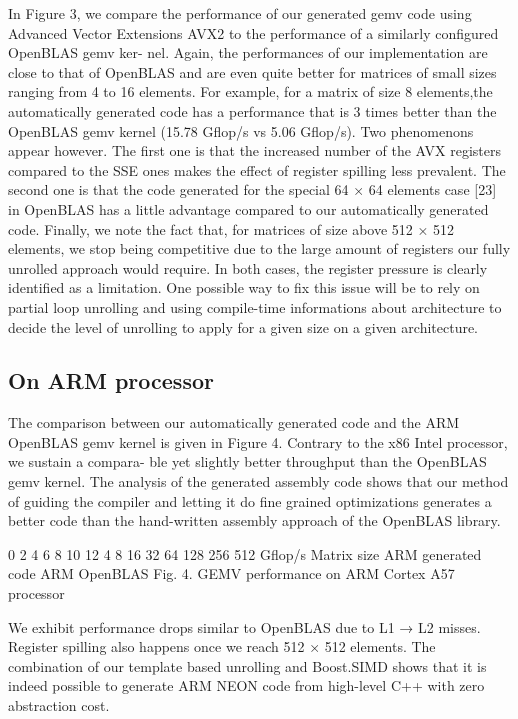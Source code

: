 \documentclass[../../main.tex]{subfiles}
\begin{document}
In Figure 3, we compare the performance of our generated
gemv code using Advanced Vector Extensions AVX2 to the
performance of a similarly configured OpenBLAS gemv ker-
nel. Again, the performances of our implementation are close
to that of OpenBLAS and are even quite better for matrices of
small sizes ranging from 4 to 16 elements. For example, for a
matrix of size 8 elements,the automatically generated code has
a performance that is 3 times better than the OpenBLAS gemv
kernel (15.78 Gflop/s vs 5.06 Gflop/s). Two phenomenons
appear however. The first one is that the increased number
of the AVX registers compared to the SSE ones makes the
effect of register spilling less prevalent. The second one is
that the code generated for the special 64 × 64 elements
case [23] in OpenBLAS has a little advantage compared to
our automatically generated code. Finally, we note the fact
that, for matrices of size above 512 × 512 elements, we stop
being competitive due to the large amount of registers our
fully unrolled approach would require.
In both cases, the register pressure is clearly identified as a
limitation. One possible way to fix this issue will be to rely
on partial loop unrolling and using compile-time informations
about architecture to decide the level of unrolling to apply for
a given size on a given architecture.

\subsection{On ARM processor}

The comparison between our automatically generated code
and the ARM OpenBLAS gemv kernel is given in Figure 4.
Contrary to the x86 Intel processor, we sustain a compara-
ble yet slightly better throughput than the OpenBLAS gemv
kernel. The analysis of the generated assembly code shows
that our method of guiding the compiler and letting it do
fine grained optimizations generates a better code than the
hand-written assembly approach of the OpenBLAS library.

0
2
4
6
8
10
12
4 8 16 32 64 128 256 512
Gflop/s
Matrix size
ARM generated code
ARM OpenBLAS
Fig. 4. GEMV performance on ARM Cortex A57 processor

We exhibit performance drops similar to OpenBLAS due to
L1 → L2 misses. Register spilling also happens once we reach
512 × 512 elements. The combination of our template based
unrolling and Boost.SIMD shows that it is indeed possible to
generate ARM NEON code from high-level C++ with zero
abstraction cost.
\end{document}
